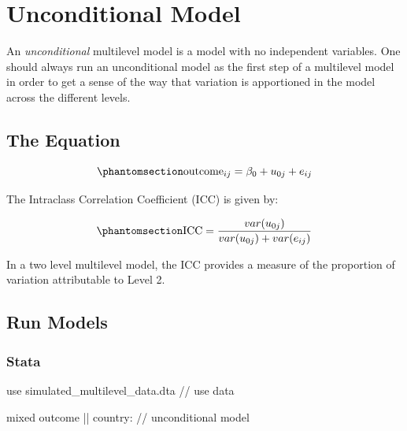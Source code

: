 \documentclass[
  letterpaper,
  DIV=11,
  numbers=noendperiod]{scrreprt}
\newenvironment{Shaded}{\begin{snugshade}}{\end{snugshade}}
\newcommand{\CommentTok}[1]{\textcolor[rgb]{0.37,0.37,0.37}{#1}}
\newcommand{\KeywordTok}[1]{\textcolor[rgb]{0.00,0.23,0.31}{#1}}
\newcommand{\NormalTok}[1]{\textcolor[rgb]{0.00,0.23,0.31}{#1}}
\begin{document}

\chapter{Unconditional Model}\label{unconditional-model}

An \emph{unconditional} multilevel model is a model with no independent
variables. One should always run an unconditional model as the first
step of a multilevel model in order to get a sense of the way that
variation is apportioned in the model across the different levels.

\section{The Equation}\label{the-equation}

\begin{equation}\phantomsection\label{eq-MLMunconditional}{\text{outcome}_{ij}= \beta_0 + u_{0j} + e_{ij}}\end{equation}

The Intraclass Correlation Coefficient (ICC) is given by:

\begin{equation}\phantomsection\label{eq-ICCunconditional}{\text{ICC} = \frac{var(u_{0j})}{var(u_{0j}) + var(e_{ij})}}\end{equation}

In a two level multilevel model, the ICC provides a measure of the
proportion of variation attributable to Level 2.

\section{Run Models}\label{run-models}

\subsection{Stata}

\begin{Shaded}
\begin{Highlighting}[]

\KeywordTok{use}\NormalTok{ simulated\_multilevel\_data.dta }\CommentTok{// use data}
\end{Highlighting}
\end{Shaded}

\begin{Shaded}
\begin{Highlighting}[]

\NormalTok{mixed outcome || country: }\CommentTok{// unconditional model}
  
\end{Highlighting}
\end{Shaded}
\end{document}
